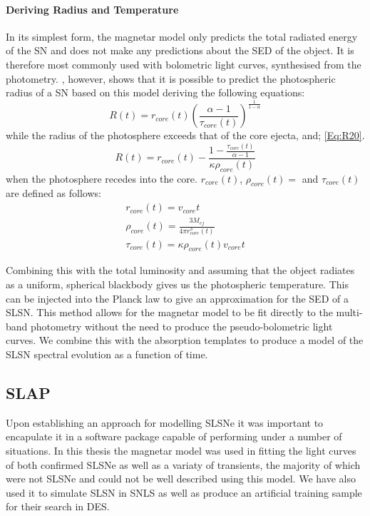 \paragraph{Deriving Radius and Temperature}
In its simplest form, the magnetar model only predicts the total radiated energy of the SN and does not make any predictions about the SED of the object. It is therefore most commonly used with bolometric light curves, synthesised from the photometry. \citet{Inserra2013}, however, shows that it is possible to predict the photospheric radius of a SN based on this model deriving the following equations:
\begin{equation}
\label{Eq:R19}
R(t) = r_{core}(t) \left(\frac{\alpha - 1}{\tau_{core}(t)}\right)^\frac{1}{1 - \alpha}
\end{equation}
\noindent while the radius of the photosphere exceeds that of the core ejecta, and;
\ref{Eq:R20}.
\begin{equation}
\label{Eq:R20}
R(t) = r_{core}(t) - \frac{1 - \frac{\tau_{core}(t)}{\alpha - 1}}{\kappa \rho_{core}(t)}
\end{equation}
\noindent when the photosphere recedes into the core. $r_{core}(t)$, $\rho_{core}(t)=$ and $\tau_{core}(t)$ are defined as follows:
\begin{align}
r_{core}(t) = v_{core}  t \\
\rho_{core}(t)= \frac{3 M_{ej}}{4  \pi  r_{core}^3(t)}\\
\tau_{core}(t) = \kappa  \rho_{core}(t) v_{core} t
\end{align}

Combining this with the total luminosity and assuming that the object radiates as a uniform, spherical blackbody gives us the photospheric temperature. This can be injected into the Planck law to give an approximation for the SED of a SLSN. This method allows for the magnetar model to be fit directly to the multi-band photometry without the need to produce the pseudo-bolometric light curves. We combine this with the absorption templates to produce a model of the SLSN spectral evolution as a function of time.

\subsection{SLAP}
Upon establishing an approach for modelling SLSNe it was important to encapulate it in a software package capable of performing under a number of situations. In this thesis the magnetar model was used in fitting the light curves of both confirmed SLSNe as well as a variaty of transients, the majority of which were not SLSNe and could not be well described using this model. We have also used it to simulate SLSN in SNLS as well as produce an artificial training sample for their search in DES.

